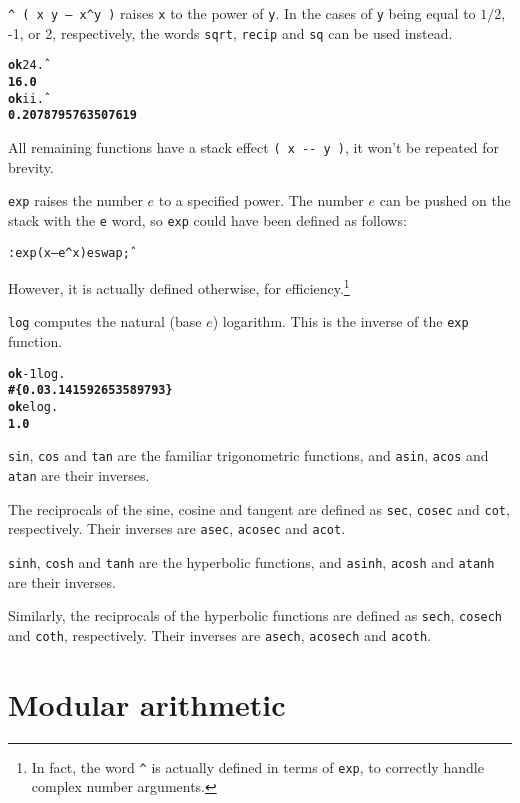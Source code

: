 \documentclass[english]{book}
\begin{document}
\texttt{\^{} ( x y -- x\^{}y )} raises \texttt{x} to the power of \texttt{y}. In the cases of \texttt{y} being equal to $1/2$, -1, or 2, respectively, the words \texttt{sqrt}, \texttt{recip} and \texttt{sq} can be used instead.

\begin{alltt}
\textbf{ok} 2 4 \^ .
\textbf{16.0}
\textbf{ok} i i \^ .
\textbf{0.2078795763507619}
\end{alltt}

All remaining functions have a stack effect \texttt{( x -{}- y )}, it won't be repeated for brevity.

\texttt{exp} raises the number $e$ to a specified power. The number $e$ can be pushed on the stack with the \texttt{e} word, so \texttt{exp} could have been defined as follows:

\begin{alltt}
: exp ( x -- e^x ) e swap \^ ;
\end{alltt}

However, it is actually defined otherwise, for efficiency.\footnote{In fact, the word \texttt{\^{}} is actually defined in terms of \texttt{exp}, to correctly handle complex number arguments.}

\texttt{log} computes the natural (base $e$) logarithm. This is the inverse of the \texttt{exp} function.

\begin{alltt}
\textbf{ok} -1 log .
\textbf{\#\{ 0.0 3.141592653589793 \}}
\textbf{ok} e log .
\textbf{1.0}
\end{alltt}

\texttt{sin}, \texttt{cos} and \texttt{tan} are the familiar trigonometric functions, and \texttt{asin}, \texttt{acos} and \texttt{atan} are their inverses.

The reciprocals of the sine, cosine and tangent are defined as \texttt{sec}, \texttt{cosec} and \texttt{cot}, respectively. Their inverses are \texttt{asec}, \texttt{acosec} and \texttt{acot}.

\texttt{sinh}, \texttt{cosh} and \texttt{tanh} are the hyperbolic functions, and \texttt{asinh}, \texttt{acosh} and \texttt{atanh} are their inverses.

Similarly, the reciprocals of the hyperbolic functions are defined as \texttt{sech}, \texttt{cosech} and \texttt{coth}, respectively. Their inverses are \texttt{asech}, \texttt{acosech} and \texttt{acoth}.

\section{Modular arithmetic}
\end{document}
